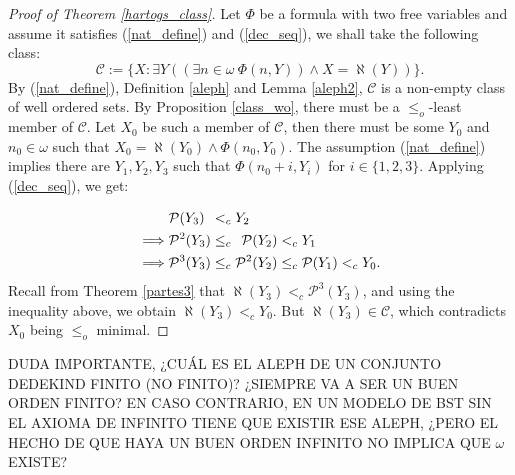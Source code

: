 \begin{proof}[Proof of Theorem \ref{hartogs_class}]
	Let $\Phi$ be a formula with two free variables and assume it satisfies (\ref{nat_define}) and (\ref{dec_seq}), we shall take the following class:
	\[
		 \mathcal{C} := \{X: \exists Y ((\exists n\in\omega \ \Phi(n,Y)) \land X = \aleph(Y))\}.
	\]
	By (\ref{nat_define}), Definition \ref{aleph} and Lemma \ref{aleph2}, $\mathcal{C}$ is a non-empty class of well ordered sets. By Proposition \ref{class_wo}, there must be a $\leq_o$-least member of $\mathcal{C}$.
	Let $X_0$ be such a member of $\mathcal{C}$, then there must be some $Y_0$ and $n_0 \in\omega$ such that $X_0 = \aleph(Y_0) \land \Phi(n_0,Y_0)$.
	The assumption (\ref{nat_define}) implies there are $Y_1 , Y_2, Y_3$ such that $\Phi(n_0 + i , Y_i)$ for $i\in\{1,2,3\}$.
	Applying (\ref{dec_seq}), we get:
	
	\begin{align*}
		&\mathcal{P}(Y_3) \hspace{4.5 pt} <_c Y_2
		\\ \implies &\mathcal{P}^2(Y_3) \leq_c \hspace{4.5 pt} \mathcal{P}(Y_2) <_c Y_1
		\\ \implies &\mathcal{P}^3(Y_3) \leq_c \mathcal{P}^{2}(Y_2) \leq_c \mathcal{P}(Y_1) <_c Y_0.
	\end{align*}
	Recall from Theorem \ref{partes3} that $\aleph(Y_3) <_c \mathcal{P}^{3}(Y_3)$, and using the inequality above, we obtain $\aleph(Y_3) <_c Y_0$. But $\aleph(Y_3)\in\mathcal{C}$, which contradicts $X_0$ being $\leq_o$ minimal. 
\end{proof}

DUDA IMPORTANTE, ¿CUÁL ES EL ALEPH DE UN CONJUNTO DEDEKIND FINITO (NO FINITO)? ¿SIEMPRE VA A SER UN BUEN ORDEN FINITO? EN CASO CONTRARIO, EN UN MODELO DE BST SIN EL AXIOMA DE INFINITO TIENE QUE EXISTIR ESE ALEPH, ¿PERO EL HECHO DE QUE HAYA UN BUEN ORDEN INFINITO NO IMPLICA QUE $\omega$ EXISTE?




\printindex
